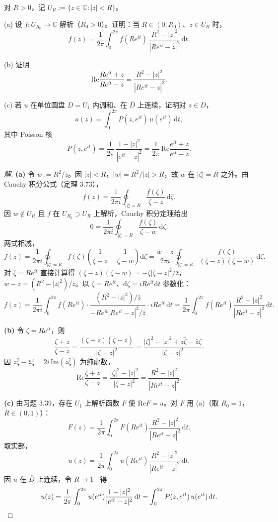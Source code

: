 \documentclass[11pt,a4paper]{article}
\newcommand{\C}{\mathbb{C}}
\renewcommand{\Re}{\mathrm{Re}}
\renewcommand{\Im}{\mathrm{Im}}
\newcommand{\dd}{\mathrm{d}}
\theoremstyle{definition}
\newenvironment{solution}{\begin{proof}[解]}{\end{proof}}
\begin{document}
对 $R > 0$，记 $U_R := \{z \in \C : |z| < R\}$。

(a) 设 $f : U_{R_0} \to \C$ 解析（$R_0 > 0$）。证明：当 $R \in (0, R_0)$、$z \in U_R$ 时，
\[
  f(z) = \frac{1}{2\pi}\int_0^{2\pi}
  f(Re^{it})\,\frac{R^2 - |z|^2}{|Re^{it} - z|^2}\,\dd t.
\]

(b) 证明
\[
  \Re\frac{Re^{it} + z}{Re^{it} - z}
  = \frac{R^2 - |z|^2}{|Re^{it} - z|^2}.
\]

(c) 若 $u$ 在单位圆盘 $D = U_1$ 内调和、在 $\bar{D}$ 上连续，证明对 $z \in D$，
\[
  u(z) = \int_0^{2\pi} P(z, e^{it})\,u(e^{it})\,\dd t,
\]
其中 Poisson 核
\[
  P(z, e^{it})
  = \frac{1}{2\pi}\,\frac{1 - |z|^2}{|e^{it} - z|^2}
  = \frac{1}{2\pi}\,\Re\frac{e^{it} + z}{e^{it} - z}.
\]

\begin{solution}
  \textbf{(a)}\;
  令 $w := R^2/\bar{z}$。因 $|z|<R$，$|w| = R^2/|z| > R$，故 $w$ 在 $|\zeta|=R$ 之外。由 Cauchy 积分公式（定理 3.73），
  \[
    f(z) = \frac{1}{2\pi i}\oint_{|\zeta|=R}
    \frac{f(\zeta)}{\zeta - z}\,\dd\zeta.
  \]
  因 $w \notin U_R$ 且 $f$ 在 $U_{R_0}\supset U_R$ 上解析，Cauchy 积分定理给出
  \[
    0 = \frac{1}{2\pi i}\oint_{|\zeta|=R}
    \frac{f(\zeta)}{\zeta - w}\,\dd\zeta.
  \]
  两式相减，
  \[
    f(z) = \frac{1}{2\pi i}\oint_{|\zeta|=R}f(\zeta)
    \left(\frac{1}{\zeta-z}-\frac{1}{\zeta-w}\right)\dd\zeta
    = \frac{w-z}{2\pi i}\oint_{|\zeta|=R}
    \frac{f(\zeta)}{(\zeta-z)(\zeta-w)}\,\dd\zeta.
  \]
  对 $\zeta = Re^{it}$ 直接计算得 $(\zeta-z)(\zeta-w) = -\zeta|\zeta-z|^2/\bar{z}$，$w-z = (R^2-|z|^2)/\bar{z}$。以 $\zeta = Re^{it}$、$\dd\zeta = iRe^{it}\dd t$ 参数化：
  \[
    f(z) = \frac{1}{2\pi i}\int_0^{2\pi}
    f(Re^{it})\cdot
    \frac{(R^2-|z|^2)/\bar{z}}{-Re^{it}|Re^{it}-z|^2/\bar{z}}
    \cdot iRe^{it}\,\dd t
    = \frac{1}{2\pi}\int_0^{2\pi}
    f(Re^{it})\frac{R^2-|z|^2}{|Re^{it}-z|^2}\,\dd t.
  \]

  \medskip

  \textbf{(b)}\;
  令 $\zeta = Re^{it}$，则
  \[
    \frac{\zeta+z}{\zeta-z}
    = \frac{(\zeta+z)(\bar\zeta-\bar z)}{|\zeta-z|^2}
    = \frac{|\zeta|^2 - |z|^2 + z\bar\zeta - \bar z\zeta}
    {|\zeta-z|^2}.
  \]
  因 $z\bar\zeta-\bar z\zeta = 2i\,\Im(z\bar\zeta)$ 为纯虚数，
  \[
    \Re\frac{\zeta+z}{\zeta-z}
    = \frac{|\zeta|^2-|z|^2}{|\zeta-z|^2}
    = \frac{R^2-|z|^2}{|Re^{it}-z|^2}.
  \]

  \medskip

  \textbf{(c)}\;
  由习题 3.39，存在 $U_1$ 上解析函数 $F$ 使 $\Re F = u$。对 $F$ 用 (a)（取 $R_0 = 1$，$R \in (0,1)$）：
  \[
    F(z) = \frac{1}{2\pi}\int_0^{2\pi}
    F(Re^{it})\frac{R^2-|z|^2}{|Re^{it}-z|^2}\,\dd t.
  \]
  取实部，
  \[
    u(z) = \frac{1}{2\pi}\int_0^{2\pi}
    u(Re^{it})\frac{R^2-|z|^2}{|Re^{it}-z|^2}\,\dd t.
  \]
  因 $u$ 在 $\bar{D}$ 上连续，令 $R\to 1^-$ 得
  \[
    u(z) = \frac{1}{2\pi}\int_0^{2\pi}
    u(e^{it})\frac{1-|z|^2}{|e^{it}-z|^2}\,\dd t
    = \int_0^{2\pi}P(z,e^{it})\,u(e^{it})\,\dd t.\qedhere
  \]
\end{solution}
\end{document}

